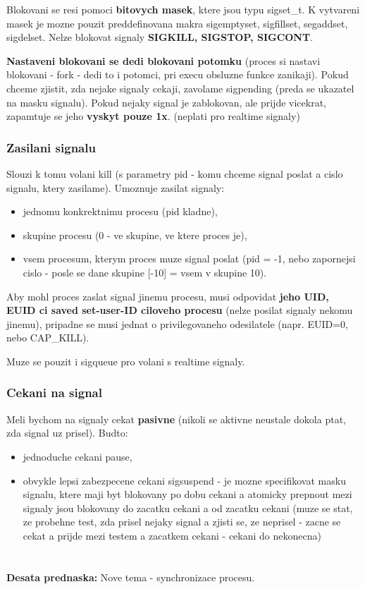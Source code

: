 \documentclass[a4paper, 11pt]{article}
\begin{document}
Blokovani se resi pomoci \textbf{bitovych masek}, ktere jsou typu sigset\_t. K vytvareni masek je mozne pouzit preddefinovana makra sigemptyset, sigfillset, segaddset, sigdelset. Nelze blokovat signaly \textbf{SIGKILL, SIGSTOP, SIGCONT}.

\textbf{Nastaveni blokovani se dedi blokovani potomku} (proces si nastavi blokovani - fork - dedi to i potomci, pri execu obsluzne funkce zanikaji). Pokud chceme zjistit, zda nejake signaly cekaji, zavolame sigpending (preda se ukazatel na masku signalu). Pokud nejaky signal je zablokovan, ale prijde vicekrat, zapamtuje se jeho \textbf{vyskyt pouze 1x}. (neplati pro realtime signaly)

\subsubsection{Zasilani signalu}
Slouzi k tomu volani kill (s parametry pid - komu chceme signal poslat a cislo signalu, ktery zasilame). Umoznuje zasilat signaly:
\begin{itemize}
    \item jednomu konkrektnimu procesu (pid kladne),
    \item skupine procesu (0 - ve skupine, ve ktere proces je),
    \item vsem procesum, kterym proces muze signal poslat (pid = -1, nebo zapornejsi cislo - posle se dane skupine [-10] = vsem v skupine 10). \\
\end{itemize}

Aby mohl proces zaslat signal jinemu procesu, musi odpovidat \textbf{jeho UID, EUID ci saved set-user-ID ciloveho procesu} (nelze posilat signaly nekomu jinemu), pripadne se musi jednat o privilegovaneho odesilatele (napr. EUID=0, nebo CAP\_KILL).

Muze se pouzit i sigqueue pro volani s realtime signaly.

\subsubsection{Cekani na signal}
Meli bychom na signaly cekat \textbf{pasivne} (nikoli se aktivne neustale dokola ptat, zda signal uz prisel). Budto:
\begin{itemize}
    \item jednoduche cekani pause,
    \item obvykle lepsi zabezpecene cekani sigsuspend - je mozne specifikovat masku signalu, ktere maji byt blokovany po dobu cekani a atomicky prepnout mezi signaly jsou blokovany do zacatku cekani a od zacatku cekani (muze se stat, ze probehne test, zda prisel nejaky signal a zjisti se, ze neprisel - zacne se cekat a prijde mezi testem a zacatkem cekani - cekani do nekonecna) \\
\end{itemize}

\newpage

\section{}
\textbf{Desata prednaska:} Nove tema - synchronizace procesu.

\subsection{}
\end{document}
